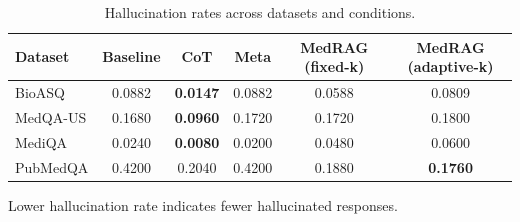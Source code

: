 \documentclass[11pt]{article}
\begin{document}
\begin{table}[H]
\centering
\caption{Hallucination rates across datasets and conditions.}
\label{tab:hallucination}
\begin{threeparttable}
\small
\setlength{\tabcolsep}{9pt}
\begin{tabular}{lccccc}
\toprule
Dataset & Baseline & CoT & Meta & MedRAG (fixed-k) & MedRAG (adaptive-k) \\
\midrule
BioASQ   & 0.0882 & \textbf{0.0147} & 0.0882 & 0.0588 & 0.0809 \\
MedQA-US & 0.1680 & \textbf{0.0960} & 0.1720 & 0.1720 & 0.1800 \\
MediQA   & 0.0240 & \textbf{0.0080} & 0.0200 & 0.0480 & 0.0600 \\
PubMedQA & 0.4200 & 0.2040 & 0.4200 & 0.1880 & \textbf{0.1760} \\
\bottomrule
\end{tabular}
\begin{tablenotes}[flushleft]
\footnotesize
\item Lower hallucination rate indicates fewer hallucinated responses.
\end{tablenotes}
\end{threeparttable}
\end{table}
\end{document}
